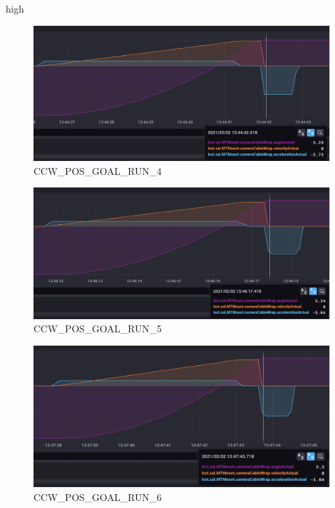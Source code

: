 high\documentclass[SE,lsstdraft,authoryear,toc]{lsstdoc}
\begin{document}
\begin{figure}[h!]
  \includegraphics[width=\linewidth]{media/CCW_high_speed_pos_test4.png}
  \caption{CCW\_POS\_GOAL\_RUN\_4}
  \label{fig:CCW_POS_GOAL_RUN_4}
\end{figure}
\begin{figure}[h!]
  \includegraphics[width=\linewidth]{media/CCW_high_speed_pos_test5.png}
  \caption{CCW\_POS\_GOAL\_RUN\_5}
  \label{fig:CCW_POS_GOAL_RUN_5}
\end{figure}
\begin{figure}[h!]
  \includegraphics[width=\linewidth]{media/CCW_high_speed_pos_test6.png}
  \caption{CCW\_POS\_GOAL\_RUN\_6}
  \label{fig:CCW_POS_GOAL_RUN_6}
\end{figure}
\end{document}
